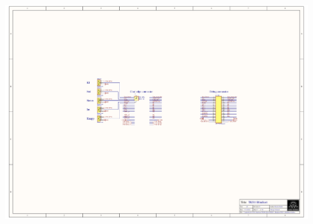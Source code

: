 \includegraphics[page=7,height=\textheight,width=\textwidth,keepaspectratio]{TK511_Blindkort.PDF}
%

